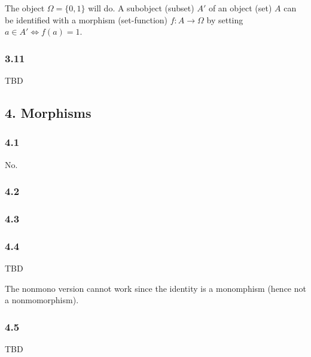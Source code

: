 \documentclass{article}
\begin{document}
The object $\Omega = \{0, 1\}$ will do. A subobject (subset) $A'$ of an object (set) $A$ can be identified with a morphism (set-function) $f: A \to \Omega$ by setting $a \in A' \iff f(a) = 1$.

\subsubsection*{3.11}

TBD

\subsection*{4. Morphisms}

\subsubsection*{4.1}

No.

\subsubsection*{4.2}

\subsubsection*{4.3}

\subsubsection*{4.4}

TBD

The nonmono version cannot work since the identity is a monomphism (hence not a nonmomorphism).

\subsubsection*{4.5}

TBD
\end{document}
